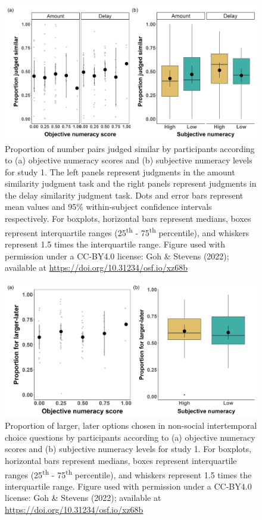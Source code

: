 \documentclass[
  doc,floatsintext]{apa6}
\begin{document}
\begin{figure}
\includegraphics[width=1\linewidth]{figures/numeracy_judgments_1} \caption{Proportion of number pairs judged similar by participants according to (a) objective numeracy scores and (b) subjective numeracy levels for study 1. The left panels represent judgments in the amount similarity judgment task and the right panels represent judgments in the delay similarity judgment task. Dots and error bars represent mean values and 95\% within-subject confidence intervals respectively. For boxplots, horizontal bars represent medians, boxes represent interquartile ranges (25\textsuperscript{th} - 75\textsuperscript{th} percentile), and whiskers represent 1.5 times the interquartile range. Figure used with permission under a CC-BY4.0 license: Goh \& Stevens (2022); available at \url{https://doi.org/10.31234/osf.io/xz68b}}\label{fig:numeracyjudgments1}
\end{figure}



\begin{figure}
\includegraphics[width=1\linewidth]{figures/numeracy_itc_1} \caption{Proportion of larger, later options chosen in non-social intertemporal choice questions by participants according to (a) objective numeracy scores and (b) subjective numeracy levels for study 1. For boxplots, horizontal bars represent medians, boxes represent interquartile ranges (25\textsuperscript{th} - 75\textsuperscript{th} percentile), and whiskers represent 1.5 times the interquartile range. Figure used with permission under a CC-BY4.0 license: Goh \& Stevens (2022); available at \url{https://doi.org/10.31234/osf.io/xz68b}}\label{fig:numeracyitc1}
\end{figure}
\end{document}
